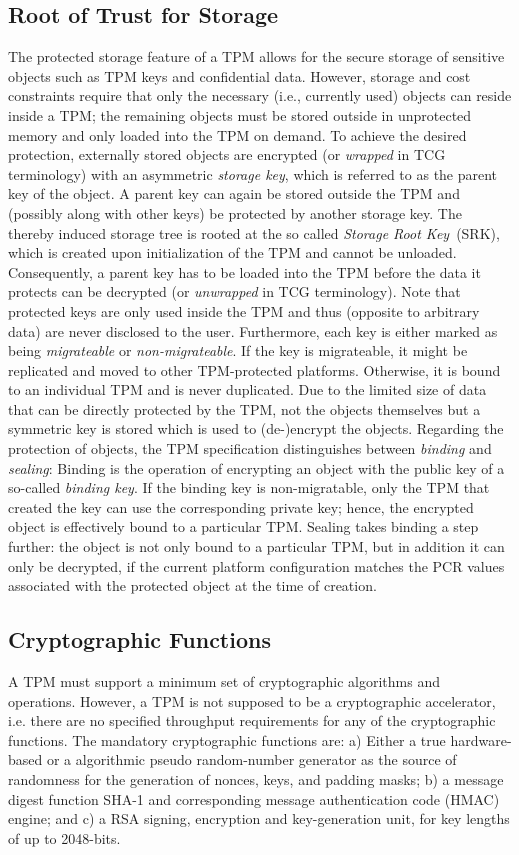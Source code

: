 \documentclass[runningheads]{llncs}
\begin{document}
\subsection{Root of Trust for Storage}
The protected storage feature of a TPM allows for the secure storage of
sensitive objects such as TPM keys and confidential data. However, storage
and cost constraints require that only the necessary (i.e., currently used)
objects can reside inside a TPM; the remaining objects must be stored outside
in unprotected memory and only loaded into the TPM on demand. To achieve the
desired protection, externally stored objects are encrypted (or \emph{wrapped}
in TCG terminology) with an asymmetric \emph{storage key}, which is referred
to as the parent key of the object. A parent key can again be stored outside
the TPM and (possibly along with other keys) be protected by another storage
key. The thereby induced storage tree is rooted at the so called \emph{Storage
Root Key}~(SRK), which is created upon initialization of the TPM and cannot
be unloaded. Consequently, a parent key has to be loaded into the TPM before
the data it protects can be decrypted (or \emph{unwrapped} in TCG terminology).
Note that protected keys are only used inside the TPM and thus (opposite to
arbitrary data) are never disclosed to the user. Furthermore, each key is
either marked as being \emph{migrateable} or \emph{non-migrateable}.
If the key is migrateable, it might be replicated and moved to other
TPM-protected platforms. Otherwise, it is bound to an individual TPM and
is never duplicated. Due to the limited size of data that can be directly
protected by the TPM, not the objects themselves but a symmetric key is
stored which is used to (de-)encrypt the objects. Regarding the protection
of objects, the TPM specification distinguishes between \emph{binding} and
\emph{sealing}: Binding is the operation of encrypting an object with the
public key of a so-called \emph{binding key}. If the binding key is
non-migratable, only the TPM that created the key can use the corresponding
private key; hence, the encrypted object is effectively bound to a particular
TPM. Sealing takes binding a step further: the object is not only bound to
a particular TPM, but in addition it can only be decrypted, if the current
platform configuration matches the PCR values associated with the protected
object at the time of creation.

\subsection{Cryptographic Functions}
A TPM must support a minimum set of cryptographic algorithms and operations.
However, a TPM is not supposed to be a cryptographic accelerator, i.e. there
are no specified throughput requirements for any of the cryptographic
functions. The mandatory cryptographic functions are: a) Either a true
hardware-based or a algorithmic pseudo random-number generator as the
source of randomness for the generation of nonces, keys, and padding masks;
b) a message digest function SHA-1 and corresponding message authentication
code (HMAC) engine; and c) a RSA signing, encryption and key-generation unit,
for key lengths of up to 2048-bits.
\end{document}
